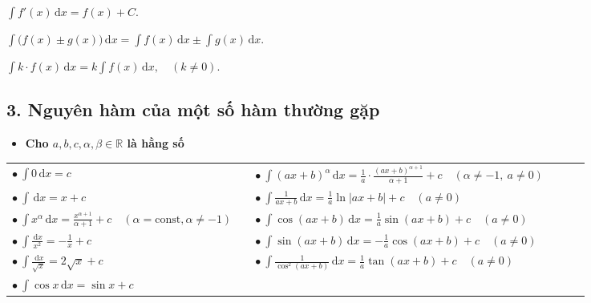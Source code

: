 \documentclass[12pt,a4paper]{article}
\newcommand{\dd}{\,\mathrm{d}}
\newcommand{\ds}{\displaystyle}
\begin{document}
{\setlength{\parskip}{1pt}
\noindent\(\displaystyle \int f'(x)\dd x=f(x)+C.\)\par
\noindent\(\displaystyle \int\bigl(f(x)\pm g(x)\bigr)\dd x=\int f(x)\dd x\pm\int g(x)\dd x.\)\par
\noindent\(\displaystyle \int k\cdot f(x)\dd x=k\int f(x)\dd x,\quad (k\ne0).\)\par}

\subsection*{3. Nguyên hàm của một số hàm thường gặp}

\begin{itemize}[itemsep=1pt]
    \item \textbf{Cho $a,b,c,\alpha,\beta\in\mathbb{R}$ là hằng số}
\end{itemize}

\vspace{-2pt}

\begin{center}
\small
\setlength{\tabcolsep}{3pt}
\renewcommand{\arraystretch}{1.35}

\begin{tabular}{|p{0.40\linewidth}|p{0.55\linewidth}|}
\hline

$\ds\bullet\ \int 0\dd x=c$
&
$\ds\bullet\ \int (ax+b)^\alpha\dd x
=\frac{1}{a}\cdot\frac{(ax+b)^{\alpha+1}}{\alpha+1}+c
\quad(\alpha\ne-1,\ a\ne0)$
\\

$\ds\bullet\ \int\dd x=x+c$
&
$\ds\bullet\ \int\frac{1}{ax+b}\dd x
=\frac{1}{a}\ln|ax+b|+c
\quad(a\ne0)$
\\

$\ds\bullet\ \int x^\alpha\dd x
=\frac{x^{\alpha+1}}{\alpha+1}+c
\quad(\alpha=\text{const},\alpha\ne-1)$
&
$\ds\bullet\ \int\cos(ax+b)\dd x
=\frac{1}{a}\sin(ax+b)+c
\quad(a\ne0)$
\\

$\ds\bullet\ \int\frac{\dd x}{x^2}
=-\frac{1}{x}+c$
&
$\ds\bullet\ \int\sin(ax+b)\dd x
=-\frac{1}{a}\cos(ax+b)+c
\quad(a\ne0)$
\\

$\ds\bullet\ \int\frac{\dd x}{\sqrt{x}}
=2\sqrt{x}+c$
&
$\ds\bullet\ \int\frac{1}{\cos^2(ax+b)}\dd x
=\frac{1}{a}\tan(ax+b)+c
\quad(a\ne0)$
\\

$\ds\bullet\ \int\cos x\dd x
=\sin x+c$
&
\\

\hline
\end{tabular}
\end{center}
\end{document}
